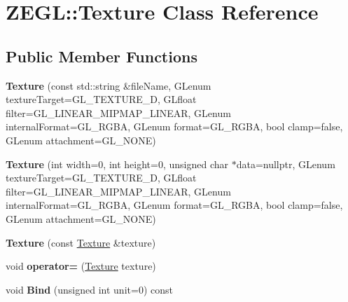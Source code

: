 \hypertarget{class_z_e_g_l_1_1_texture}{}\section{Z\+E\+G\+L\+:\+:Texture Class Reference}
\label{class_z_e_g_l_1_1_texture}
\subsection*{Public Member Functions}
\begin{DoxyCompactItemize}
\item 
\hypertarget{class_z_e_g_l_1_1_texture_a211502d1cdd7812326479b1e72b09480}{}{\bfseries Texture} (const std\+::string \&file\+Name, G\+Lenum texture\+Target=G\+L\+\_\+\+T\+E\+X\+T\+U\+R\+E\+\_\+D, G\+Lfloat filter=G\+L\+\_\+\+L\+I\+N\+E\+A\+R\+\_\+\+M\+I\+P\+M\+A\+P\+\_\+\+L\+I\+N\+E\+A\+R, G\+Lenum internal\+Format=G\+L\+\_\+\+R\+G\+B\+A, G\+Lenum format=G\+L\+\_\+\+R\+G\+B\+A, bool clamp=false, G\+Lenum attachment=G\+L\+\_\+\+N\+O\+N\+E)\label{class_z_e_g_l_1_1_texture_a211502d1cdd7812326479b1e72b09480}

\item 
\hypertarget{class_z_e_g_l_1_1_texture_a6a87674a108324e7b0f475850c9c9b2f}{}{\bfseries Texture} (int width=0, int height=0, unsigned char $\ast$data=nullptr, G\+Lenum texture\+Target=G\+L\+\_\+\+T\+E\+X\+T\+U\+R\+E\+\_\+D, G\+Lfloat filter=G\+L\+\_\+\+L\+I\+N\+E\+A\+R\+\_\+\+M\+I\+P\+M\+A\+P\+\_\+\+L\+I\+N\+E\+A\+R, G\+Lenum internal\+Format=G\+L\+\_\+\+R\+G\+B\+A, G\+Lenum format=G\+L\+\_\+\+R\+G\+B\+A, bool clamp=false, G\+Lenum attachment=G\+L\+\_\+\+N\+O\+N\+E)\label{class_z_e_g_l_1_1_texture_a6a87674a108324e7b0f475850c9c9b2f}

\item 
\hypertarget{class_z_e_g_l_1_1_texture_a21822d3a487c6a803f706869fe46faa2}{}{\bfseries Texture} (const \hyperlink{class_z_e_g_l_1_1_texture}{Texture} \&texture)\label{class_z_e_g_l_1_1_texture_a21822d3a487c6a803f706869fe46faa2}

\item 
\hypertarget{class_z_e_g_l_1_1_texture_ac8d4a47a87bb660ecd37b7ec7a70705b}{}void {\bfseries operator=} (\hyperlink{class_z_e_g_l_1_1_texture}{Texture} texture)\label{class_z_e_g_l_1_1_texture_ac8d4a47a87bb660ecd37b7ec7a70705b}

\item 
\hypertarget{class_z_e_g_l_1_1_texture_a6f54dde94704d5f2b90c63f33c67793c}{}void {\bfseries Bind} (unsigned int unit=0) const \label{class_z_e_g_l_1_1_texture_a6f54dde94704d5f2b90c63f33c67793c}


\end{DoxyCompactItemize}
